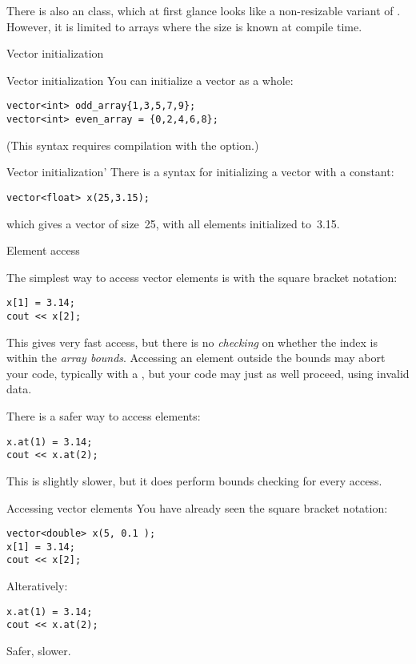 \begin{remark}
  There is also an  class, which at first glance
  looks like a non-resizable variant of . However, it is limited to
  arrays where the size is known at compile time.
\end{remark}

 {Vector initialization}

\begin{block}{Vector initialization}
  \label{sl:vector-init}
  You can initialize a vector as a whole:
\begin{verbatim}
vector<int> odd_array{1,3,5,7,9};
vector<int> even_array = {0,2,4,6,8};
\end{verbatim}
(This syntax requires compilation with the 
option.)
\end{block}

\begin{block}{Vector initialization'}
  \label{sl:vector-initconst}
  There is a syntax for initializing a vector with a constant:
\begin{verbatim}
vector<float> x(25,3.15);
\end{verbatim}
which gives a vector of size~25, with all elements initialized to~3.15.
\end{block}

 {Element access}

The simplest way to access vector elements is with the square bracket notation:
\begin{verbatim}
x[1] = 3.14;
cout << x[2];
\end{verbatim}
This gives very fast access, but there is no \emph{checking} on whether the
index is within the \emph{array
  bounds}. Accessing an element outside
the bounds may abort your code, typically with a
, but your code may just as well
proceed, using invalid data.

There is a safer way to access elements:
\begin{verbatim}
x.at(1) = 3.14;
cout << x.at(2);  
\end{verbatim}
This is slightly slower, but it does perform bounds checking for every access.

\begin{block}{Accessing vector elements}
  \label{sl:vectorsub}
  You have already seen the square bracket notation:
\begin{verbatim}
vector<double> x(5, 0.1 );
x[1] = 3.14;
cout << x[2];
\end{verbatim}
Alteratively:
\begin{verbatim}
x.at(1) = 3.14;
cout << x.at(2);
\end{verbatim}
Safer, slower.
\end{block}

